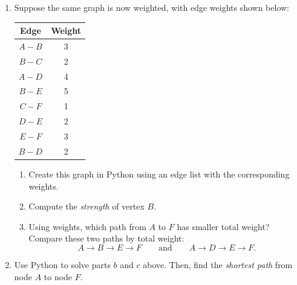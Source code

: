 \documentclass[10pt]{article}
\begin{document}
\begin{enumerate}[{$1.]
\begin{enumerate}[{$a.)$}]
\end{enumerate}


\pagebreak 




\item Suppose the same graph is now weighted, with edge weights shown below:

\begin{center}
\begin{tabular}{c|c}
Edge & Weight \\ \hline
$A\!-\!B$ & 3 \\
$B\!-\!C$ & 2 \\
$A\!-\!D$ & 4 \\
$B\!-\!E$ & 5 \\
$C\!-\!F$ & 1 \\
$D\!-\!E$ & 2 \\
$E\!-\!F$ & 3 \\
$B\!-\!D$ & 2 \\
\end{tabular}
\end{center}

\begin{enumerate}[{$a.)$}]
\item Create this graph in Python using an edge list with the corresponding weights.

\item Compute the \textit{strength} of vertex $B$.
\vfill

\item Using weights, which path from $A$ to $F$ has smaller total weight?
Compare these two paths by total weight:
\[
A\to B\to E\to F
\qquad\text{and}\qquad
A\to D\to E\to F.
\]
\vfill
\end{enumerate}

\item Use Python to solve parts $b$ and $c$ above.  Then, find the \textit{shortest path} from node $A$ to node $F$.  

\end{enumerate}

%
%
%
\end{document}
